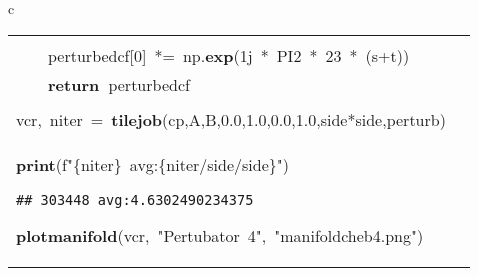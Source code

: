 \documentclass{article}\usepackage[]{graphicx}\usepackage[dvipsnames,table]{xcolor}
\makeatletter
\newcommand{\hlnum}[1]{\textcolor[rgb]{0.686,0.059,0.569}{#1}}%
\newcommand{\hlsng}[1]{\textcolor[rgb]{0.192,0.494,0.8}{#1}}%
\newcommand{\hlopt}[1]{\textcolor[rgb]{0,0,0}{#1}}%
\newcommand{\hldef}[1]{\textcolor[rgb]{0.345,0.345,0.345}{#1}}%
\newcommand{\hlkwa}[1]{\textcolor[rgb]{0.161,0.373,0.58}{\textbf{#1}}}%
\newcommand{\hlkwb}[1]{\textcolor[rgb]{0.69,0.353,0.396}{#1}}%
\newcommand{\hlkwd}[1]{\textcolor[rgb]{0.737,0.353,0.396}{\textbf{#1}}}%
\let\hlipl\hlkwb
\newenvironment{kframe}{%
 \def\at@end@of@kframe{}%
 \ifinner\ifhmode%
  \def\at@end@of@kframe{\end{minipage}}%
  \begin{minipage}{\columnwidth}%
 \fi\fi%
 \def\FrameCommand##1{\hskip\@totalleftmargin \hskip-\fboxsep
 \colorbox{shadecolor}{##1}\hskip-\fboxsep
     \hskip-\linewidth \hskip-\@totalleftmargin \hskip\columnwidth}%
 \MakeFramed {\advance\hsize-\width
   \@totalleftmargin\z@ \linewidth\hsize
   \@setminipage}}%
 {\par\unskip\endMakeFramed%
 \at@end@of@kframe}
\newenvironment{knitrout}{}{} %
\makeatother
\begin{document}
\begin{center}
\begin{tabular}{c}
\begin{tabular}{m{10cm}m{10cm}}
\begin{minipage}[m]{10cm}
\begin{knitrout}
\begin{kframe}
\hldef{}\hldef{\ \ \ \ }\hldef{perturbed\textunderscore cf}\hlopt{{[}{-}}\hldef{}\hlnum{11}\hldef{}\hlopt{{]}}\hldef{\ \ }\hlopt{{*}=\ }\hldef{np}\hlopt{.}\hldef{}\hlkwd{exp}\hldef{}\hlopt{(}\hldef{}\hlnum{1}\hldef{j\ }\hlopt{{*}\ }\hldef{PI2\ }\hlopt{{*}\ }\hldef{}\hlnum{19\ }\hldef{}\hlopt{{*}\ (}\hldef{s\ }\hlopt{+\ }\hldef{t}\hlopt{))}\hspace*{\fill}\\
\hldef{}\hldef{\ \ \ \ }\hldef{perturbed\textunderscore cf}\hlopt{{[}}\hldef{}\hlnum{0}\hldef{}\hlopt{{]}\ {*}=\ }\hldef{np}\hlopt{.}\hldef{}\hlkwd{exp}\hldef{}\hlopt{(}\hldef{}\hlnum{1}\hldef{j\ }\hlopt{{*}\ }\hldef{PI2\ }\hlopt{{*}\ }\hldef{}\hlnum{23\ }\hldef{}\hlopt{{*}\ (}\hldef{s}\hlopt{+}\hldef{t}\hlopt{))}\hspace*{\fill}\\
\hldef{}\hldef{\ \ \ \ }\hldef{}\hlkwa{return\ }\hldef{perturbed\textunderscore cf}\hspace*{\fill}\\
\hldef{}\hspace*{\fill}\\
\hldef{vcr}\hlopt{,\ }\hldef{niter\ }\hlopt{=\ }\hldef{}\hlkwd{tile\textunderscore job}\hldef{}\hlopt{(}\hldef{cp}\hlopt{,}\hldef{A}\hlopt{,}\hldef{B}\hlopt{,}\hldef{}\hlnum{0.0}\hldef{}\hlopt{,}\hldef{}\hlnum{1.0}\hldef{}\hlopt{,}\hldef{}\hlnum{0.0}\hldef{}\hlopt{,}\hldef{}\hlnum{1.0}\hldef{}\hlopt{,}\hldef{side}\hlopt{{*}}\hldef{side}\hlopt{,}\hldef{perturb\textunderscore 4}\hlopt{)}\hspace*{\fill}\\
\hldef{}\hlkwa{print}\hldef{}\hlopt{(}\hldef{f}\hlsng{"}\hlipl{\{niter\}\ }\hlsng{avg:}\hlipl{\{niter/side/side\}}\hlsng{"}\hldef{}\hlopt{)}\hldef{}\hspace*{\fill}
\mbox{}
\normalfont
\begin{verbatim}
## 303448 avg:4.6302490234375
\end{verbatim}
\noindent
\ttfamily
\hldef{}\hlkwd{plot\textunderscore manifold}\hldef{}\hlopt{(}\hldef{vcr}\hlopt{,\ }\hldef{}\hlsng{"Pertubator\ 4"}\hldef{}\hlopt{,\ }\hldef{}\hlsng{"manifold\textunderscore cheb4.png"}\hldef{}\hlopt{)}\hldef{}\hspace*{\fill}
\mbox{}
\normalfont
\end{kframe}
\end{knitrout}
\end{minipage}
&
\begin{minipage}[m]{10cm}
\begin{knitrout}\tiny
\definecolor{shadecolor}{rgb}{0.969, 0.969, 0.969}\color{fgcolor}\begin{kframe}

\end{kframe}
\end{knitrout}
\end{minipage}
\end{tabular}
\end{tabular}
\end{center}
\end{document}
